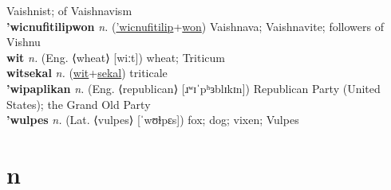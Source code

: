 Vaishnist; of Vaishnavism \label{'wicnufitilipak} \\
\textbf{'wicnufitilipwon} \textit{n.} (\hyperref['wicnufitilip]{'wicnufitilip}+\hyperref[won]{won})
Vaishnava; Vaishnavite; followers of Vishnu \label{'wicnufitilipwon} \\
\textbf{wit} \textit{n.} (Eng. ⟨wheat⟩ [wiːt])
wheat; Triticum \label{wit} \\
\textbf{witsekal} \textit{n.} (\hyperref[wit]{wit}+\hyperref[sekal]{sekal})
triticale \label{witsekal} \\
\textbf{'wipaplikan} \textit{n.} (Eng. ⟨republican⟩ [ɹʷɪˈpʰɜblɪkɪn])
Republican Party (United States); the Grand Old Party \label{'wipaplikan} \\
\textbf{'wulpes} \textit{n.} (Lat. ⟨vulpes⟩ [ˈwʊɫpɛs])
fox; dog; vixen; Vulpes \label{'wulpes} 

\section{n}

